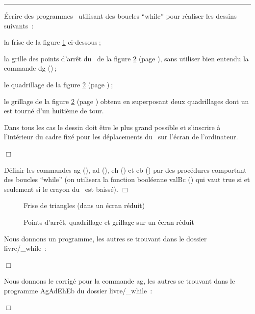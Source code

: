 \clearpage
\noindent \rule{137mm}{0.1mm} %
\begin{exercices}{Écrire des programmes \ocaml\  utilisant des boucles ``while'' pour réaliser les
dessins suivants~:

\tiret  la frise de la figure \ref{fig:FriTri} ci-dessous$\:$;

\tiret  la grille des points d'arrêt du \robot\ de la figure \ref{fig:DgQuGr} (page \pageref{fig:DgQuGr}),
sans utiliser bien entendu la commande {\idt dg ()}$\:$;

\tiret  le quadrillage de la figure \ref{fig:DgQuGr} (page \pageref{fig:DgQuGr})$\:$;

\tiret  le grillage de la figure \ref{fig:DgQuGr} (page \pageref{fig:DgQuGr}) obtenu en superposant deux
qua\-dril\-la\-ges dont un est tourné d'un huitième de tour.

Dans tous les cas le dessin doit être le plus grand possible et s'inscrire à l'intérieur du cadre fixé pour les
déplacements du \robot\ sur l'écran de l'ordinateur.

\noindent $\Box$}\end{exercices}

\vspace*{-1ex}%
\begin{exercice}{Définir les commandes {\idt ag ()},  {\idt ad ()},  {\idt eh ()} et  {\idt eb ()} par des procédures comportant
des boucles ``while'' (on utilisera la fonction booléenne {\idt valBc ()} qui vaut {\idt true} si et
seulement si le crayon du \robot\ est baissé).
\noindent $\Box$}\end{exercice}

\begin{figure}[htbp]
 \caption{Frise de triangles (dans un écran réduit)}\label{fig:FriTri}
\end{figure}
\begin{figure}[htbp]
 \caption{Points d'arrêt, quadrillage et grillage sur un écran réduit}\label{fig:DgQuGr}
\end{figure}

\vspace*{-1ex}%
\begin{corrige}{
Nous donnons un programme, les autres se trouvant dans le dossier {\idt livre/\_while}~:

\noindent $\Box$}\end{corrige}
\begin{corrige}{
Nous donnons le corrigé pour la commande {\idt ag}, les autres se trouvant dans le programme
{\idt AgAdEhEb} du dossier {\idt livre/\_while}~:

\noindent $\Box$}\end{corrige}

